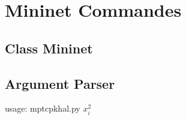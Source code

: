 
\section{Mininet Commandes}
\label{sec:annexe1:mininet}

\subsection{Class Mininet}
\label{sec:annexe1:mininetClass}


\subsection{Argument Parser}
\label{sec:annexe1:mininetParserargs}

usage: mptcpkhal.py $x_i^2$

